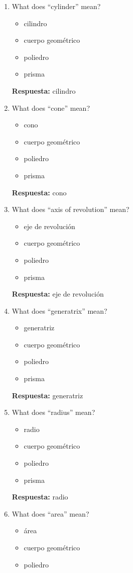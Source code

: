 \documentclass[11pt,a4paper]{article}
\begin{document}
\begin{enumerate}
\begin{itemize}
\end{itemize}
\textbf{Respuesta:} cuerpo de revolución
\item What does ``cylinder'' mean?
\begin{itemize}
\item cilindro
\item cuerpo geométrico
\item poliedro
\item prisma
\end{itemize}
\textbf{Respuesta:} cilindro
\item What does ``cone'' mean?
\begin{itemize}
\item cono
\item cuerpo geométrico
\item poliedro
\item prisma
\end{itemize}
\textbf{Respuesta:} cono
\item What does ``axis of revolution'' mean?
\begin{itemize}
\item eje de revolución
\item cuerpo geométrico
\item poliedro
\item prisma
\end{itemize}
\textbf{Respuesta:} eje de revolución
\item What does ``generatrix'' mean?
\begin{itemize}
\item generatriz
\item cuerpo geométrico
\item poliedro
\item prisma
\end{itemize}
\textbf{Respuesta:} generatriz
\item What does ``radius'' mean?
\begin{itemize}
\item radio
\item cuerpo geométrico
\item poliedro
\item prisma
\end{itemize}
\textbf{Respuesta:} radio
\item What does ``area'' mean?
\begin{itemize}
\item área
\item cuerpo geométrico
\item poliedro

\end{itemize}
\end{enumerate}
\end{document}
